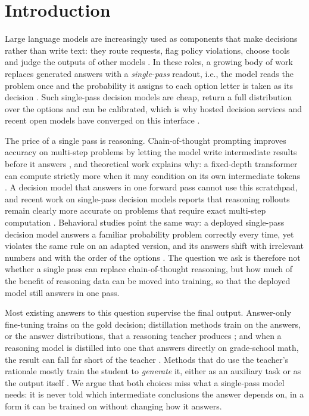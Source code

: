 \documentclass{article}
\begin{document}
\section{Introduction}

Large language models are increasingly used as components that make decisions rather than write text: they route
requests, flag policy violations, choose tools and judge the outputs of other models
\citep{ldm2026}. In these roles, a growing body of work replaces generated answers with a
\emph{single-pass} readout, i.e., the model reads the problem once and the probability it assigns to each option
letter is taken as its decision \citep{ldm2026}. Such single-pass decision models are cheap, return a full
distribution over the options and can be calibrated, which is why hosted decision services and recent open models
have converged on this interface \citep{ldm2026}.

The price of a single pass is reasoning. Chain-of-thought prompting improves accuracy on multi-step problems by
letting the model write intermediate results before it answers \citep{wei2022cot}, and theoretical work explains why:
a fixed-depth transformer can compute strictly more when it may condition on its own intermediate tokens
\citep{feng2023mystery,merrill2024expressive}. A decision model that answers in one forward pass cannot use this
scratchpad, and recent work on single-pass decision models reports that reasoning rollouts remain clearly more
accurate on problems that require exact multi-step computation \citep{ldm2026}. Behavioral studies point the same way:
a deployed single-pass decision model answers a familiar probability problem correctly every time, yet violates the
same rule on an adapted version, and its answers shift with irrelevant numbers and with the order of the options
\citep{imperatrice2026jevbias}. The question we ask is therefore not
whether a single pass can replace chain-of-thought reasoning, but how much of the benefit of reasoning data can be
moved into training, so that the deployed model still answers in one pass.

Most existing answers to this question supervise the final output. Answer-only fine-tuning trains on the gold
decision; distillation methods train on the answers, or the answer distributions, that a reasoning teacher produces
\citep{yu2024system2,ldm2026}; and when a reasoning model is distilled into one that answers directly on grade-school
math, the result can fall far short of the teacher \citep{yu2024system2}. Methods that do use the teacher's rationale
mostly train the student to \emph{generate} it, either as an auxiliary task \citep{hsieh2023dss,li2022explanations} or
as the output itself \citep{ho2023teachers,shridhar2023socratic}. We argue that both choices miss what a single-pass
model needs: it is never told which intermediate conclusions the answer depends on, in a form it can be trained on
without changing how it answers.
\end{document}
